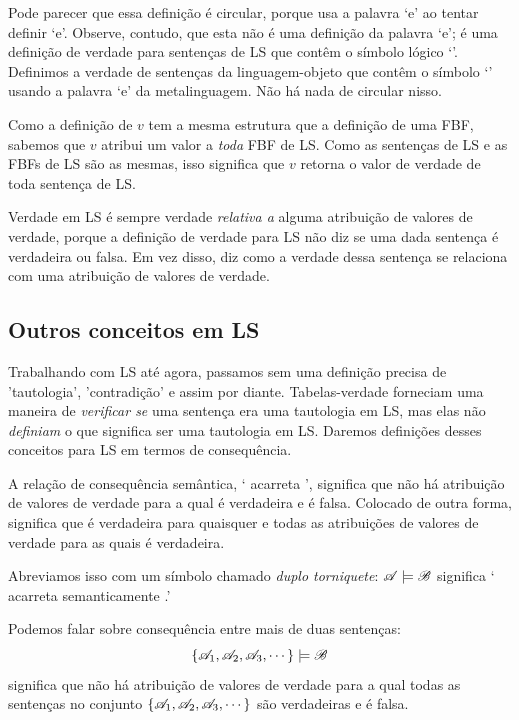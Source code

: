 Pode parecer que essa definição é circular, porque usa a palavra `e' ao tentar definir `e'. Observe, contudo, que esta não é uma definição da palavra `e'; é uma definição de verdade para sentenças de LS que contêm o símbolo lógico `\eand'. Definimos a verdade de sentenças da linguagem-objeto que contêm o símbolo `\eand' usando a palavra `e' da metalinguagem. Não há nada de circular nisso.

Como a definição de $v$ tem a mesma estrutura que a definição de uma FBF, sabemos que $v$ atribui um valor a \emph{toda} FBF de LS. Como as sentenças de LS e as FBFs de LS são as mesmas, isso significa que $v$ retorna o valor de verdade de toda sentença de LS.

Verdade em LS é sempre verdade \emph{relativa a} alguma atribuição de valores de verdade, porque a definição de verdade para LS não diz se uma dada sentença é verdadeira ou falsa. Em vez disso, diz como a verdade dessa sentença se relaciona com uma atribuição de valores de verdade.

\subsection{Outros conceitos em LS}

Trabalhando com LS até agora, passamos sem uma definição precisa de 'tautologia', 'contradição' e assim por diante. Tabelas-verdade forneciam uma maneira de \emph{verificar se} uma sentença era uma tautologia em LS, mas elas não \emph{definiam} o que significa ser uma tautologia em LS. Daremos definições desses conceitos para LS em termos de consequência.

A relação de consequência semântica, ` acarreta ', significa que não há atribuição de valores de verdade para a qual  é verdadeira e  é falsa. Colocado de outra forma, significa que  é verdadeira para quaisquer e todas as atribuições de valores de verdade para as quais  é verdadeira.

Abreviamos isso com um símbolo chamado \emph{duplo torniquete}:
$\mathscr{A}\models\mathscr{B}$ significa ` acarreta semanticamente .'

Podemos falar sobre consequência entre mais de duas sentenças: $$\{\mathscr{A}_1,\mathscr{A}_2,\mathscr{A}_3,\cdots\}\models\mathscr{B}$$ significa que não há atribuição de valores de verdade para a qual todas as sentenças no conjunto $\{\mathscr{A}_1,\mathscr{A}_2,\mathscr{A}_3,\cdots\}$ são verdadeiras e  é falsa.

